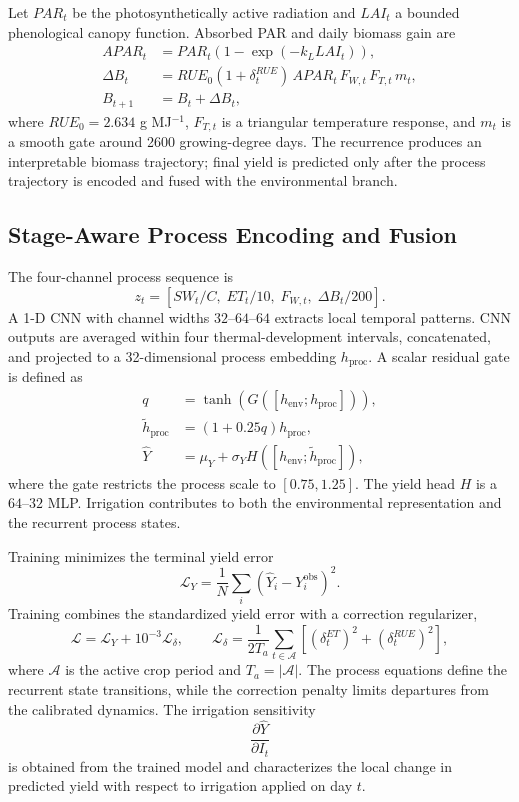 \documentclass{article}
\begin{document}
Let $PAR_t$ be the photosynthetically active radiation and $LAI_t$ a bounded phenological canopy function. Absorbed PAR and daily biomass gain are
\begin{align}
 APAR_t &= PAR_t\left(1-\exp(-k_L LAI_t)\right),\\
 \Delta B_t &= RUE_0(1+\delta_t^{RUE})\,APAR_t\,F_{W,t}\,F_{T,t}\,m_t,\\
 B_{t+1} &= B_t+\Delta B_t,
 \label{eq:growth}
\end{align}
where $RUE_0=2.634$ g MJ$^{-1}$, $F_{T,t}$ is a triangular temperature response, and $m_t$ is a smooth gate around 2600 growing-degree days. The recurrence produces an interpretable biomass trajectory; final yield is predicted only after the process trajectory is encoded and fused with the environmental branch.

\subsection{Stage-Aware Process Encoding and Fusion}
The four-channel process sequence is
\begin{equation}
 z_t=\left[SW_t/C,\;ET_t/10,\;F_{W,t},\;\Delta B_t/200\right].
 \label{eq:process_state}
\end{equation}
A 1-D CNN with channel widths $32$--$64$--$64$ extracts local temporal patterns. CNN outputs are averaged within four thermal-development intervals, concatenated, and projected to a 32-dimensional process embedding $h_{\mathrm{proc}}$. A scalar residual gate is defined as
\begin{align}
 q&=\tanh\!\left(G([h_{\mathrm{env}};h_{\mathrm{proc}}])\right),\\
 \tilde h_{\mathrm{proc}}&=(1+0.25q)h_{\mathrm{proc}},\\
 \hat Y&=\mu_Y+\sigma_Y H([h_{\mathrm{env}};\tilde h_{\mathrm{proc}}]),
 \label{eq:yield}
\end{align}
where the gate restricts the process scale to $[0.75,1.25]$. The yield head $H$ is a $64$--$32$ MLP. Irrigation contributes to both the environmental representation and the recurrent process states.

Training minimizes the terminal yield error
\begin{equation}
 \mathcal L_Y=\frac{1}{N}\sum_i(\hat Y_i-Y_i^{\mathrm{obs}})^2.
\end{equation}
Training combines the standardized yield error with a correction regularizer,
\begin{equation}
 \mathcal L=\mathcal L_Y+10^{-3}\mathcal L_{\delta},\qquad
 \mathcal L_{\delta}=\frac{1}{2T_a}\sum_{t\in\mathcal A}
 \left[(\delta_t^{ET})^2+(\delta_t^{RUE})^2\right],
 \label{eq:loss}
\end{equation}
where $\mathcal A$ is the active crop period and $T_a=|\mathcal A|$. The process equations define the recurrent state transitions, while the correction penalty limits departures from the calibrated dynamics. The irrigation sensitivity
\begin{equation}
 \frac{\partial \hat Y}{\partial I_t}
\end{equation}
is obtained from the trained model and characterizes the local change in predicted yield with respect to irrigation applied on day $t$.
\end{document}
